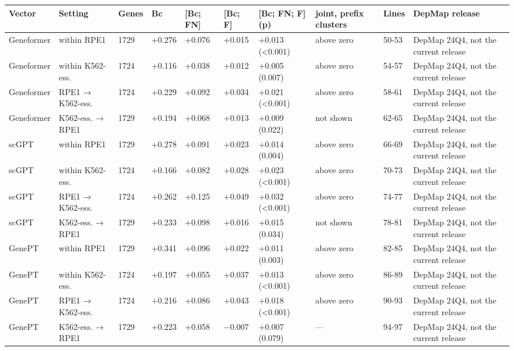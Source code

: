 \begin{tabular}{llllllllll}
\toprule
Vector & Setting & Genes & Bc & [Bc; FN] & [Bc; F] & [Bc; FN; F] (p) & joint, prefix clusters & Lines & DepMap release \\
\midrule
Geneformer & within RPE1 & 1729 & +0.276 & +0.076 & +0.015 & +0.013 (<0.001) & above zero & 50-53 & DepMap 24Q4, not the current release \\
Geneformer & within K562-ess. & 1724 & +0.116 & +0.038 & +0.012 & +0.005 (0.007) & above zero & 54-57 & DepMap 24Q4, not the current release \\
Geneformer & RPE1 → K562-ess. & 1724 & +0.229 & +0.092 & +0.034 & +0.021 (<0.001) & above zero & 58-61 & DepMap 24Q4, not the current release \\
Geneformer & K562-ess. → RPE1 & 1729 & +0.194 & +0.068 & +0.013 & +0.009 (0.022) & not shown & 62-65 & DepMap 24Q4, not the current release \\
scGPT & within RPE1 & 1729 & +0.278 & +0.091 & +0.023 & +0.014 (0.004) & above zero & 66-69 & DepMap 24Q4, not the current release \\
scGPT & within K562-ess. & 1724 & +0.166 & +0.082 & +0.028 & +0.023 (<0.001) & above zero & 70-73 & DepMap 24Q4, not the current release \\
scGPT & RPE1 → K562-ess. & 1724 & +0.262 & +0.125 & +0.049 & +0.032 (<0.001) & above zero & 74-77 & DepMap 24Q4, not the current release \\
scGPT & K562-ess. → RPE1 & 1729 & +0.233 & +0.098 & +0.016 & +0.015 (0.034) & not shown & 78-81 & DepMap 24Q4, not the current release \\
GenePT & within RPE1 & 1729 & +0.341 & +0.096 & +0.022 & +0.011 (0.003) & above zero & 82-85 & DepMap 24Q4, not the current release \\
GenePT & within K562-ess. & 1724 & +0.197 & +0.055 & +0.037 & +0.013 (<0.001) & above zero & 86-89 & DepMap 24Q4, not the current release \\
GenePT & RPE1 → K562-ess. & 1724 & +0.216 & +0.086 & +0.043 & +0.018 (<0.001) & above zero & 90-93 & DepMap 24Q4, not the current release \\
GenePT & K562-ess. → RPE1 & 1729 & +0.223 & +0.058 & −0.007 & +0.007 (0.079) & — & 94-97 & DepMap 24Q4, not the current release \\
\bottomrule
\end{tabular}
